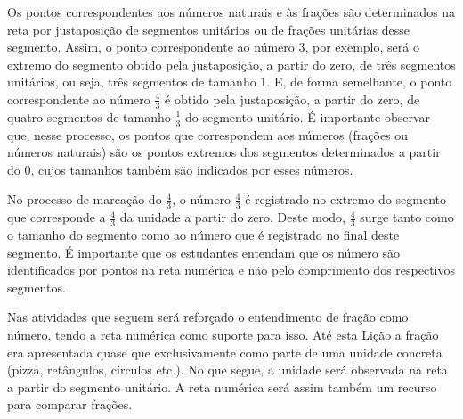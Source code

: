 Os pontos correspondentes aos números naturais e às frações são determinados na reta por justaposição de segmentos unitários ou de frações unitárias desse segmento. Assim, o ponto correspondente ao número $3$, por exemplo, será o extremo do segmento obtido pela justaposição, a partir do zero, de três segmentos unitários, ou seja, três segmentos de tamanho $1$. E, de forma semelhante, o ponto correspondente ao número $\frac{4}{3}$ é obtido pela justaposição, a partir do zero, de quatro segmentos de tamanho $\frac{1}{3}$ do segmento unitário. É importante observar que, nesse processo, os pontos que correspondem aos números (frações ou números naturais) são os pontos extremos dos segmentos determinados a partir do $0$, cujos tamanhos também são indicados por esses números.

No processo de marcação do $\frac{4}{3}$, o número $\frac{4}{3}$ é registrado no extremo do segmento que corresponde a $\frac{4}{3}$ da unidade a partir do zero.  Deste modo, $\frac{4}{3}$ surge tanto como o tamanho do segmento como ao número que é registrado no final deste segmento. É importante que os estudantes entendam que os número são identificados por pontos na reta numérica e não pelo comprimento dos respectivos segmentos. 

\begin{center}
  
\end{center}

Nas atividades que seguem será reforçado  o entendimento de fração como número, tendo a reta numérica como suporte para isso. Até esta Lição a fração era apresentada quase que exclusivamente como parte de uma unidade concreta (pizza, retângulos, círculos etc.). No que segue, a unidade será observada na reta a partir do segmento unitário. A reta numérica será assim também um recurso para comparar frações. 

\anotacoes

\anotacoes

